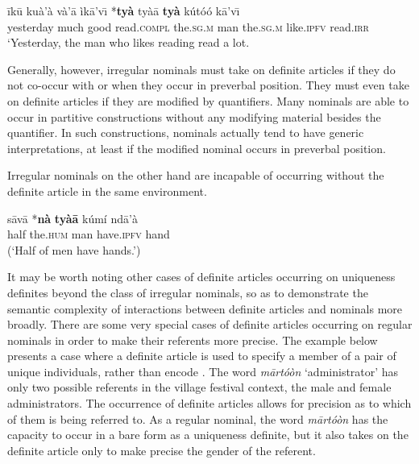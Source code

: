 \documentclass[output=paper,modfonts,nonflat]{langsci/langscibook}
\begin{document}
\ex
\gll
 \=ik\=u ku\`a'\`a v\`a'\=a \`ik\=a'v\=\i{} {\ob}\textnormal{*}{\op}\textbf{ty\`a}{\cp} ty\`a\=a \textbf{ty\`a} k\'ut\'o\'o k\=a'v\=\i{}{\cb}\\
yesterday much good read.\textsc{compl} \phantom{[*(}the.\textsc{sg.m} man the.\textsc{sg.m} like.\textsc{ipfv} read.\textsc{irr}\\
\glt
`Yesterday, the man who likes reading read a lot.
\z 
\z

Generally, however, irregular nominals must take on definite articles if they do not co-occur with  or when they occur in preverbal position.  They must even take on definite articles if they are modified by quantifiers.  Many nominals are able to occur in partitive constructions without any modifying material besides the quantifier.  In such constructions, nominals actually tend to have generic interpretations, at least if the modified nominal occurs in preverbal position.

\z 

\z 

Irregular nominals on the other hand are incapable of occurring without the definite article in the same environment.

\ea {}\label{ex:cisneros:79}
\gll
{\ob}s\=av\=a \textnormal{*}{\op}\textbf{n\`a}{\cp} \textbf{ty\`a\=a}{\cb} k\'um\'i nd\=a'\`a\\
{\db}half \phantom{*(}the.\textsc{hum} man have.\textsc{ipfv} hand\\
\glt
(`Half of men have hands.')
\z 

It may be worth noting other cases of definite articles occurring on uniqueness definites beyond the class of irregular nominals, so  as to demonstrate the semantic complexity of interactions between definite articles and nominals more broadly.  There are some very special cases of definite articles occurring on regular nominals in order to make their referents more precise.  The example below presents a case where a definite article is used to specify a member of a pair of unique individuals, rather than encode .  The word \textit{m\=art\'o\`on} `administrator' has only two possible referents in the village festival context, the male and female administrators.  The occurrence of definite articles allows for precision as to which of them is being referred to.  As a regular nominal, the word \textit{m\=art\'o\`on} has the capacity to occur in a bare form as a uniqueness definite, but it also takes on the definite article only to make precise the gender of the referent. 
\end{document}
